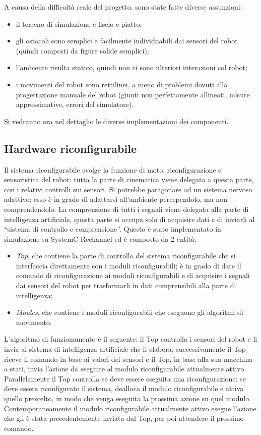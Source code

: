 \documentclass[11pt]{article} %
\begin{document}
A causa della difficoltà reale del progetto, sono state fatte diverse assunzioni:
\begin{itemize}
  \item il terreno di simulazione è liscio e piatto;
  \item gli ostacoli sono semplici e facilmente individuabili dai sensori del robot (quindi composti da figure solide semplici);
  \item l'ambiente risulta statico, quindi non ci sono ulteriori interazioni col robot;
  \item i movimenti del robot sono rettilinei, a meno di problemi dovuti alla progettazione manuale del robot (giunti non perfettamente allineati, misure approssimative, errori del simulatore).
\end{itemize}

Si vedranno ora nel dettaglio le diverse implementazioni dei componenti.

\subsection{Hardware riconfigurabile}

Il sistema riconfigurabile svolge la funzione di moto, riconfigurazione e sensoristica del robot: tutta la parte di cinematica viene delegata a questa parte, con i relativi controlli sui sensori. Si potrebbe paragonare ad un sistema nervoso adattivo: esso è in grado di adattarsi all'ambiente percependolo, ma non comprendendolo. La comprensione di tutti i segnali viene delegata alla parte di intelligenza artificiale, questa parte si occupa solo di acquisire dati e di inviarli al ``sistema di controllo e comprensione''.
Questo è stato implementato in simulazione su SystemC Rechannel ed è composto da 2 entità:

\begin{itemize}
  \item \textit{Top}, che contiene la parte di controllo del sistema riconfigurabile che si interfaccia direttamente con i moduli riconfigurabili; è in grado di dare il comando di riconfigurazione ai moduli riconfigurabili e di acquisire i segnali dai sensori del robot per trasformarli in dati comprensibili alla parte di intelligenza;
  \item \textit{Moules}, che contiene i moduli riconfigurabili che eseguono gli algoritmi di movimento.
\end{itemize}

L'algoritmo di funzionamento è il seguente: il Top controlla i sensori del robot e li invia al sistema di intelligenza artificiale che li elabora; successivamente il Top riceve il comando in base ai valori dei sensori e il Top, in base alla sua macchina a stati, invia l'azione da eseguire al modulo riconfigurabile attualmente attivo.
Parallelamente il Top controlla se deve essere eseguita una riconfigurazione: se deve essere riconfigurato il sistema, dealloca il modulo riconfigurabile e attiva quello prescelto, in modo che venga eseguita la prossima azione su quel modulo.
Contemporaneamente il modulo riconfigurabile attualmente attivo esegue l'azione che gli è stata precedentemente inviata dal Top, per poi attendere il prossimo comando.
\end{document}

